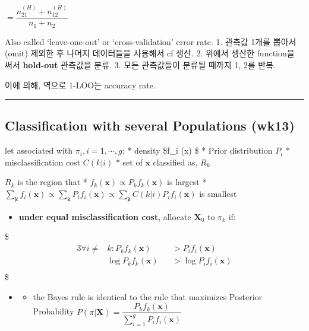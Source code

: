 \documentclass[
]{book}
\providecommand{\tightlist}{%
  \setlength{\itemsep}{0pt}\setlength{\parskip}{0pt}}
\begin{document}
{{{\(= \dfrac {n_{21}^{(H)} + n_{12}^{(H)}} {n_1 + n_2}\)

Also called `leave-one-out' or `cross-validation' error rate.
1. 관측값 1개를 뽑아서 (omit) 제외한 후 나머지 데이터들을 사용해서 cf 생산.
2. 위에서 생산한 function을 써서 \textbf{hold-out} 관측값을 분류.
3. 모든 관측값들이 분류될 때까지 1, 2를 반복.

이에 의해, 역으로 1-LOO는 accuracy rate.

\begin{center}\rule{0.5\linewidth}{0.5pt}\end{center}

\hypertarget{classification-with-several-populations-wk13}{%
\subsection{Classification with several Populations (wk13)}\label{classification-with-several-populations-wk13}}

let associated with \(\pi_i , i = 1, \cdots, g\):
* density \$f\_i (\pmb x) \$
* Prior distribution \(P_i\)
* misclassification cost \(C(k \vert i)\)
* set of \(\pmb x\) classified as, \(R_k\)

\(R_k\) is the region that
* \(f_k(\pmb x) \propto P_k f_k(\pmb x)\) is largest
* \(\sum_{\not k} f_i(\pmb x) \propto \sum_{\not k} P_i f_i(\pmb x) \propto \sum_{\not k} C(k \vert i) P_i f_i(\pmb x)\) is smallest

\begin{itemize}
\tightlist
\item
  \textbf{under equal misclassification cost}, allocate \(\pmb X_0\) to \(\pi_k\) if:
\end{itemize}

\$
\begin{alignat*}{3}
\forall i \not = &k: P_k f_k (\pmb x) &&>P_i f_i (\pmb x) \\
&\log P_k f_k (\pmb x) &&>\log P_i f_i (\pmb x) \\
\end{alignat*}
\$

\begin{itemize}
\item
  \begin{itemize}
  \tightlist
  \item
    the Bayes rule is identical to the rule that maximizes Posterior Probability \(P(\pi \vert \pmb X) = \dfrac{P_k f_k (\pmb x)}{\sum_{i=1}^g P_i f_i (\pmb x)}\)
  \end{itemize}
\end{itemize}

}}}
\end{document}
